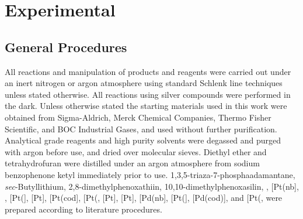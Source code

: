 
\chapter{Experimental}
\label{ch:expt}

\section{General Procedures}
\label{section:generalprocedures}

\setlength{\emergencystretch}{2pt}

\begin{sloppypar}
All reactions and manipulation of products and reagents were carried out under an inert nitrogen or argon atmosphere using standard Schlenk line techniques unless stated otherwise.  All reactions using silver compounds were performed in the dark.  Unless otherwise stated the starting materials used in this work were obtained from Sigma-Aldrich, Merck Chemical Companies, Thermo Fisher Scientific, and BOC Industrial Gases, and used without further purification.  Analytical grade reagents and high purity solvents were degassed and purged with argon before use, and dried over molecular sieves.  Diethyl ether and tetrahydrofuran were distilled under an argon atmosphere from sodium benzophenone ketyl immediately prior to use.  
1,3,5-tri\-aza-7-phos\-pha\-adamantane,\cite{Daigle1998a} 
\emph{sec}-Butyllithium,\cite{Dieter2001} 
2,8-di\-methyl\-phenoxathiin,\cite{Suter1938} 
10,10-dimethyl\-phenoxasilin,\cite{Kranenburg1995} 
,\cite{Koshar1973} 
[Pt(nb],\cite{Vaughan2011}
,\cite{Giordano1979}
 [Pt(],\cite{Spencer1979} 
 [Pt],\cite{Hartley1979} 
[Pt(cod],\cite{Crascall1990} 
[Pt(\ce{C6H10)Cl2]},\cite{Jensen1953} 
[Pt],\cite{Albrecht2000} 
[Pt],\cite{Cramer1967}
[Pd(nb]\cite{Green1977}, 
[Pt(],\cite{Bradthesis}
[Pd(cod)],
and [Pt(\ce{C6H10)Me2]},\cite{Vaughan2011}
were prepared according to literature procedures.  
\end{sloppypar}

